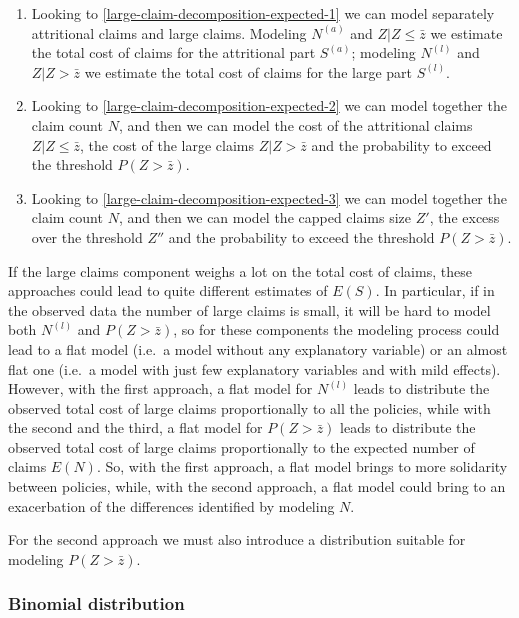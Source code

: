 \documentclass[a4paper, twoside, openright, 12pt]{report}
\providecommand{\tightlist}{%
  \setlength{\itemsep}{0pt}\setlength{\parskip}{0pt}}
\theoremstyle{definition}
\theoremstyle{definition}
\theoremstyle{definition}
\theoremstyle{remark}
\begin{document}
\begin{enumerate}
\def\labelenumi{\arabic{enumi}.}
\tightlist
\item
  Looking to \ref{large-claim-decomposition-expected-1} we can model separately attritional claims and large claims. Modeling \(N^{(a)}\) and \(Z|Z\le\bar{z}\) we estimate the total cost of claims for the attritional part \(S^{(a)}\); modeling \(N^{(l)}\) and \(Z|Z>\bar{z}\) we estimate the total cost of claims for the large part \(S^{(l)}\).
\item
  Looking to \ref{large-claim-decomposition-expected-2} we can model together the claim count \(N\), and then we can model the cost of the attritional claims \(Z|Z\le\bar{z}\), the cost of the large claims \(Z|Z>\bar{z}\) and the probability to exceed the threshold \(P(Z>\bar{z})\).
\item
  Looking to \ref{large-claim-decomposition-expected-3} we can model together the claim count \(N\), and then we can model the capped claims size \(Z'\), the excess over the threshold \(Z''\) and the probability to exceed the threshold \(P(Z>\bar{z})\).
\end{enumerate}

If the large claims component weighs a lot on the total cost of claims, these approaches could lead to quite different estimates of \(E(S)\). In particular, if in the observed data the number of large claims is small, it will be hard to model both \(N^{(l)}\) and \(P(Z>\bar{z})\), so for these components the modeling process could lead to a flat model (i.e.~a model without any explanatory variable) or an almost flat one (i.e.~a model with just few explanatory variables and with mild effects). However, with the first approach, a flat model for \(N^{(l)}\) leads to distribute the observed total cost of large claims proportionally to all the policies, while with the second and the third, a flat model for \(P(Z>\bar{z})\) leads to distribute the observed total cost of large claims proportionally to the expected number of claims \(E(N)\). So, with the first approach, a flat model brings to more solidarity between policies, while, with the second approach, a flat model could bring to an exacerbation of the differences identified by modeling \(N\).

For the second approach we must also introduce a distribution suitable for modeling \(P(Z>\bar{z})\).

\hypertarget{binomial-distribution}{%
\subsubsection{Binomial distribution}\label{binomial-distribution}}
\end{document}
